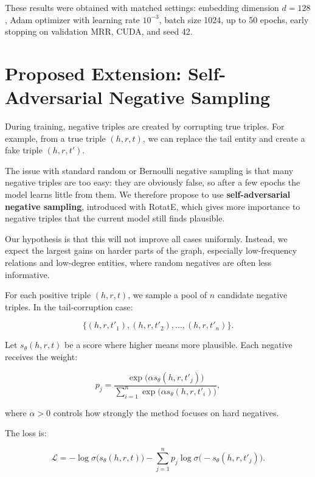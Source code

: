 \documentclass{llncs}
\begin{document}
These results were obtained with matched settings: embedding dimension
$d=128$, Adam optimizer with learning rate $10^{-3}$, batch size 1024,
up to 50 epochs, early stopping on validation MRR, CUDA, and seed 42.

\section{Proposed Extension: Self-Adversarial Negative Sampling}

During training, negative triples are created by corrupting true triples.
For example, from a true triple $(h,r,t)$, we can replace the tail entity
and create a fake triple $(h,r,t')$.

The issue with standard random or Bernoulli negative sampling is that many
negative triples are too easy: they are obviously false, so after a few
epochs the model learns little from them. We therefore propose to use
\textbf{self-adversarial negative sampling}, introduced with RotatE, which
gives more importance to negative triples that the current model still
finds plausible.

Our hypothesis is that this will not improve all cases uniformly. Instead,
we expect the largest gains on harder parts of the graph, especially
low-frequency relations and low-degree entities, where random negatives
are often less informative.

For each positive triple $(h,r,t)$, we sample a pool of $n$ candidate
negative triples. In the tail-corruption case:

\[
\{(h,r,t'_1), (h,r,t'_2), \ldots, (h,r,t'_n)\}.
\]

Let $s_\theta(h,r,t)$ be a score where higher means more plausible.
Each negative receives the weight:

\begin{equation}
  p_j
  =
  \frac{
    \exp\!\bigl(\alpha s_\theta(h,r,t'_j)\bigr)
  }{
    \sum_{i=1}^{n}
    \exp\!\bigl(\alpha s_\theta(h,r,t'_i)\bigr)
  },
  \label{eq:sadv}
\end{equation}

where $\alpha > 0$ controls how strongly the method focuses on hard
negatives.

The loss is:

\begin{equation}
  \mathcal{L}
  =
  -\log\sigma\!\bigl(s_\theta(h,r,t)\bigr)
  -
  \sum_{j=1}^{n}
  p_j
  \log\sigma\!\bigl(-s_\theta(h,r,t'_j)\bigr).
  \label{eq:loss}
\end{equation}
\end{document}
